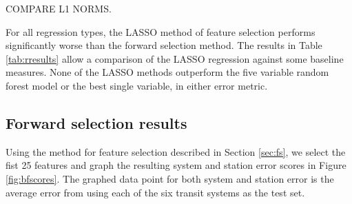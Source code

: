 \documentclass[11pt]{article}
\begin{document}
COMPARE L1 NORMS.


For all regression types, the LASSO method of feature selection performs significantly worse than the forward selection method.  The results in Table \ref{tab:rresults} allow a comparison of the LASSO regression against some baseline measures. None of the LASSO methods outperform the five variable random forest model or the best single variable, in either error metric. 


\subsection{Forward selection results}

Using the method for feature selection described in Section \ref{sec:fs}, we select the fist 25 features and graph the resulting system and station error scores in Figure \ref{fig:bfscores}. The graphed data point for both system and station error is the average error from using each of the six transit systems as the test set. 
\end{document}
